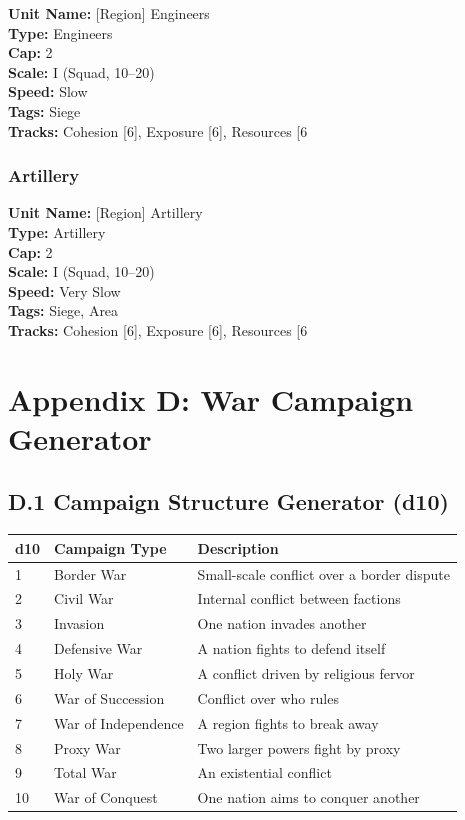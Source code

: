 \documentclass[11pt]{article}
\begin{document}
\textbf{Unit Name:} [Region] Engineers\\
\textbf{Type:} Engineers\\
\textbf{Cap:} 2\\
\textbf{Scale:} I (Squad, 10–20)\\
\textbf{Speed:} Slow\\
\textbf{Tags:} Siege\\
\textbf{Tracks:} Cohesion [6], Exposure [6], Resources [6

\subsubsection{Artillery}

\textbf{Unit Name:} [Region] Artillery\\
\textbf{Type:} Artillery\\
\textbf{Cap:} 2\\
\textbf{Scale:} I (Squad, 10–20)\\
\textbf{Speed:} Very Slow\\
\textbf{Tags:} Siege, Area\\
\textbf{Tracks:} Cohesion [6], Exposure [6], Resources [6

\section{Appendix D: War Campaign Generator}

\subsection{D.1 Campaign Structure Generator (d10)}

\begin{tabular}{|l|l|l|}
\hline
d10 & Campaign Type & Description \\
\hline
1 & Border War & Small-scale conflict over a border dispute \\
\hline
2 & Civil War & Internal conflict between factions \\
\hline
3 & Invasion & One nation invades another \\
\hline
4 & Defensive War & A nation fights to defend itself \\
\hline
5 & Holy War & A conflict driven by religious fervor \\
\hline
6 & War of Succession & Conflict over who rules \\
\hline
7 & War of Independence & A region fights to break away \\
\hline
8 & Proxy War & Two larger powers fight by proxy \\
\hline
9 & Total War & An existential conflict \\
\hline
10 & War of Conquest & One nation aims to conquer another \\
\hline
\end{tabular}
\end{document}
